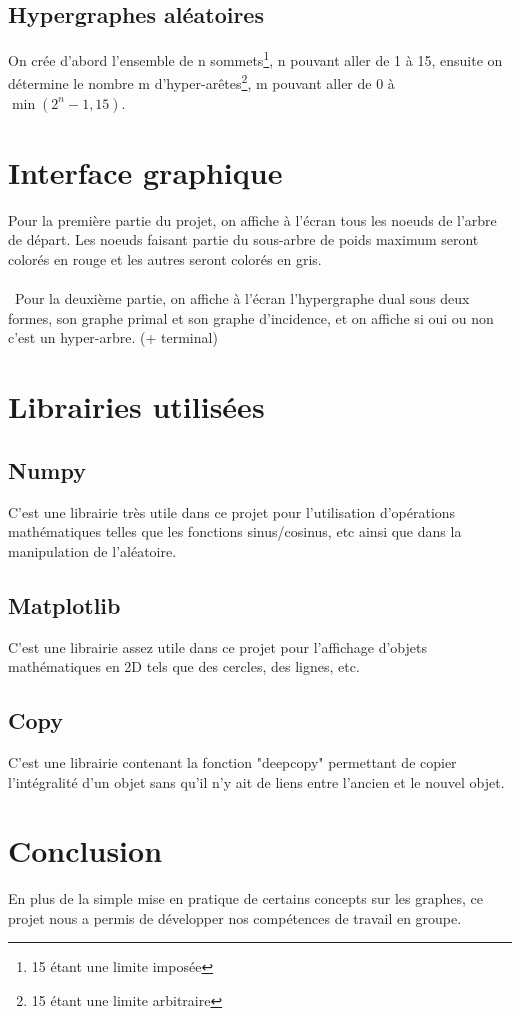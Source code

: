 \documentclass{article}
\begin{document}
	
	\subsection{Hypergraphes aléatoires}
	On crée d'abord l'ensemble de n sommets\footnote{15 étant une limite imposée}, n pouvant aller de 1 à 15, ensuite on détermine le nombre m d'hyper-arêtes\footnote{15 étant une limite arbitraire}, m pouvant aller de 0 à $\min(2^n-1,15)$.

\section{Interface graphique}
	Pour la première partie du projet, on affiche à l'écran tous les noeuds de l'arbre de départ. Les noeuds faisant partie du sous-arbre de poids maximum seront colorés en rouge et les autres seront colorés en gris.\\\ \\\ Pour la deuxième partie, on affiche à l'écran l'hypergraphe dual sous deux formes, son graphe primal et son graphe d'incidence, et on affiche si oui ou non c'est un hyper-arbre. (+ terminal)

\section{Librairies utilisées}

	\subsection{Numpy}
		C'est une librairie très utile dans ce projet pour l'utilisation d'opérations mathématiques telles que les fonctions sinus/cosinus, etc ainsi que dans la manipulation de l'aléatoire.

	\subsection{Matplotlib}
		C'est une librairie assez utile dans ce projet pour l'affichage d'objets mathématiques en 2D tels que des cercles, des lignes, etc.
	
	\subsection{Copy}
		C'est une librairie contenant la fonction "deepcopy" permettant de copier l'intégralité d'un objet sans qu'il n'y ait de liens entre l'ancien et le nouvel objet.

\section{Conclusion}
	En plus de la simple mise en pratique de certains concepts sur les graphes, ce projet nous a permis de développer nos compétences de travail en groupe.
\end{document}
